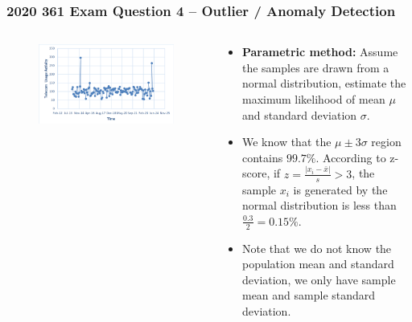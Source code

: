 \documentclass[aspectratio=169, 10pt]{beamer}
\begin{document}
\begin{frame}
    \frametitle{2020 361 Exam Question 4 -- Outlier / Anomaly Detection}
    
    \begin{columns}[]
        \begin{column}{0.5\textwidth}
            \begin{figure}
                \centering
                \includegraphics[width=\textwidth]{../imgs/question4.png}
            \end{figure}
        \end{column}
        \begin{column}{0.5\textwidth}
            \begin{itemize}
                \item \textbf{Parametric method:} Assume the samples are drawn from a normal distribution, estimate the maximum likelihood of mean $\mu$ and standard deviation $\sigma$.
                \item We know that the $\mu \pm 3 \sigma$ region contains $99.7\%$. According to z-score, if $z=\frac{|x_i-\bar{x}|}{s} > 3$, the sample $x_i$ is generated by the normal distribution is less than $\frac{0.3}{2}=0.15\%$.
                \item Note that we do not know the population mean and standard deviation, we only have sample mean and sample standard deviation.
            \end{itemize}
        \end{column}
    \end{columns}

\end{frame}
\end{document}
